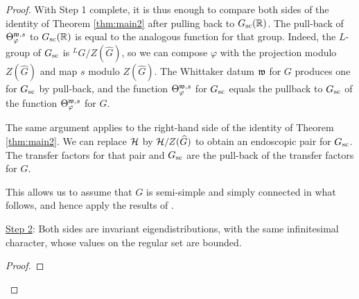 \documentclass{article}
\theoremstyle{definition}
\numberwithin{equation}{section}
\renewcommand{\-}{\hyp{}}
\begin{document}
\begin{proof}
With Step 1 complete, it is thus enough to compare both sides of the identity of Theorem \ref{thm:main2} after pulling back to $G_{\textrm{sc}}(\mathbb{R})$. The pull-back of $\Theta_{\varphi}^{\mathfrak{w},s}$ to $G_{\textrm{sc}}(\mathbb{R})$ is equal to the analogous function for that group. Indeed, the $L$-group of $G_{\textrm{sc}}$ is $^LG/Z(\hat G)$, so we can compose $\varphi$ with the projection modulo $Z(\hat G)$ and map $s$ modulo $Z(\hat G)$. The Whittaker datum $\mathfrak{w}$ for $G$ produces one for $G_{\textrm{sc}}$ by pull-back, and the function $\Theta_{\varphi}^{\mathfrak{w},s}$ for $G_{\textrm{sc}}$ equals the pullback to $G_{\textrm{sc}}$ of the function $\Theta_{\varphi}^{\mathfrak{w},s}$ for $G$.

The same argument applies to the right-hand side of the identity of Theorem \ref{thm:main2}. We can replace $\mathcal{H}$ by $\mathcal{H}/Z(\widehat G)$ to obtain an endoscopic pair for $G_{\textrm{sc}}$. The transfer factors for that pair and $G_{\textrm{sc}}$ are the pull-back of the transfer factors for $G$.

This allows us to assume that $G$ is semi-simple and simply connected in what follows, and hence apply the results of \cite{HCDSI}.


  \underline{Step 2}: Both sides are invariant eigendistributions, with the same infinitesimal character, whose values on the regular set are bounded.  

	\begin{proof}


\end{proof}
\end{proof}
\end{document}
